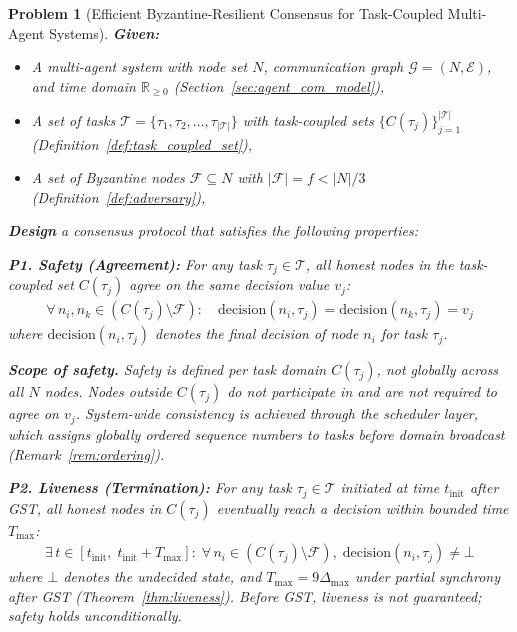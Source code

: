 \documentclass[manuscript,screen,review]{acmart}
\newtheorem{problem}{Problem}
\begin{document}
\begin{problem}[Efficient Byzantine-Resilient Consensus for Task-Coupled Multi-Agent Systems]
\label{prob:main}
\textbf{Given:}
\begin{itemize}
    \item A multi-agent system with node set $N$, communication graph $\mathcal{G} = (N, \mathcal{E})$, and time domain $\mathbb{R}_{\geq 0}$ (Section~\ref{sec:agent_com_model}),
    \item A set of tasks $\mathcal{T} = \{\tau_1, \tau_2, \ldots, \tau_{|\mathcal{T}|}\}$ with task-coupled sets $\{C(\tau_j)\}_{j=1}^{|\mathcal{T}|}$ (Definition~\ref{def:task_coupled_set}),
    \item A set of Byzantine nodes $\mathcal{F} \subseteq N$ with $|\mathcal{F}| = f < |N|/3$ (Definition~\ref{def:adversary}),
\end{itemize}

\noindent \textbf{Design} a consensus protocol that satisfies the following properties:

\vspace{0.3cm}
\noindent \textbf{P1. Safety (Agreement):} For any task $\tau_j \in \mathcal{T}$, all honest nodes in the task-coupled set $C(\tau_j)$ agree on the same decision value $v_j$:
\begin{equation}
\begin{aligned}
\forall\, n_i, n_k \in (C(\tau_j) \setminus \mathcal{F}):\quad
\text{decision}(n_i, \tau_j) = \text{decision}(n_k, \tau_j) = v_j
\label{eq:safety}
\end{aligned}
\end{equation}
where $\text{decision}(n_i, \tau_j)$ denotes the final decision of node $n_i$ for task $\tau_j$.

\textbf{Scope of safety.} Safety is defined \emph{per task domain} $C(\tau_j)$, not globally across all $N$ nodes. Nodes outside $C(\tau_j)$ do not participate in and are not required to agree on $v_j$. System-wide consistency is achieved through the scheduler layer, which assigns globally ordered sequence numbers to tasks before domain broadcast (Remark~\ref{rem:ordering}).

\vspace{0.3cm}
\noindent \textbf{P2. Liveness (Termination):} For any task $\tau_j \in \mathcal{T}$ initiated at time $t_{\text{init}}$ \emph{after GST}, all honest nodes in $C(\tau_j)$ eventually reach a decision within bounded time $T_{\max}$:
\begin{equation}
\begin{aligned}
\exists\, t \in [t_{\text{init}},\; t_{\text{init}} + T_{\max}]:\;
\forall\, n_i \in (C(\tau_j) \setminus \mathcal{F}),\;
\text{decision}(n_i, \tau_j) \neq \bot
\label{eq:liveness}
\end{aligned}
\end{equation}
where $\bot$ denotes the undecided state, and $T_{\max} = 9\Delta_{\max}$ under partial synchrony after GST (Theorem~\ref{thm:liveness}). Before GST, liveness is not guaranteed; safety holds unconditionally.


\end{problem}
\end{document}
